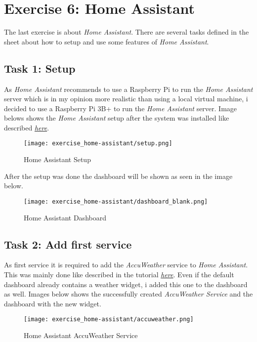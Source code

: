 \section{Exercise 6: Home Assistant}
The last exercise is about \textit{Home Assistant}. 
There are several tasks defined in the sheet about how to setup and use some features of \textit{Home Assistant}.

\subsection{Task 1: Setup}
As \textit{Home Assistant} recommends to use a Raspberry Pi to run the \textit{Home Assistant} server 
which is in my opinion more realistic than using a local virtual machine, i decided to use a Raspberry Pi 3B+ 
to run the \textit{Home Assistant} server. Image belows shows the \textit{Home Assistant} setup after the system was 
installed like described \href{https://www.home-assistant.io/installation/raspberrypi}{\textit{here}}.

\begin{figure}[H]
    \centering
    \texttt{[image: exercise\_home-assistant/setup.png]}
    \caption{Home Assistant Setup}
    \label{fig:home_assistant_setup}
\end{figure}

After the setup was done the dashboard will be shown as seen in the image below.

\begin{figure}[H]
    \centering
    \texttt{[image: exercise\_home-assistant/dashboard\_blank.png]}
    \caption{Home Assistant Dashboard}
    \label{fig:home_assistant_dashboard}
\end{figure}

\subsection{Task 2: Add first service}
As first service it is required to add the \textit{AccuWeather} service to \textit{Home Assistant}.
This was mainly done like described in the tutorial \href{https://www.home-assistant.io/integrations/accuweather}{\textit{here}}.
Even if the default dashboard already contains a weather widget, i added this one to the dashboard as well.
Images below shows the successfully created \textit{AccuWeather Service} and the dashboard with the new widget.

\begin{figure}[H]
    \centering
    \texttt{[image: exercise\_home-assistant/accuweather.png]}
    \caption{Home Assistant AccuWeather Service}
    \label{fig:home_assistant_accuweather_service}
\end{figure}

